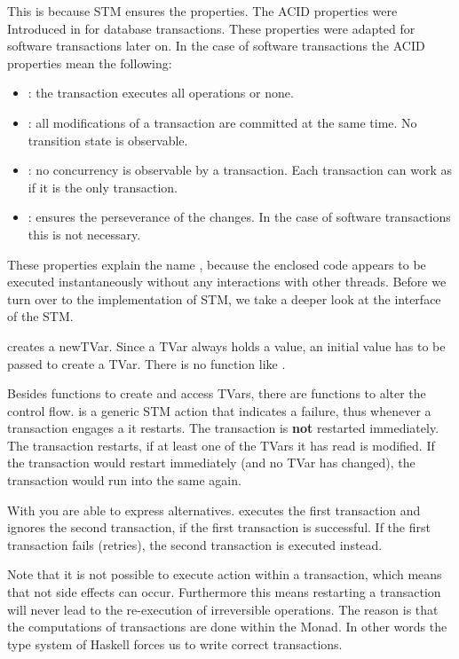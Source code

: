 This is because STM ensures the  properties. The ACID properties were Introduced in \parencite{DBTrans} for
database transactions. These properties were adapted for software transactions later on.
In the case of software transactions the ACID properties mean the following:
\begin{itemize}
 \item {}: the transaction executes all operations or none.
 \item {}: all modifications of a transaction are committed at the same time. No transition state is observable.
 \item {}: no concurrency is observable by a transaction. Each transaction can work as if it is the only transaction.
 \item {}: ensures the perseverance of the changes. In the case of software transactions this is not necessary.
\end{itemize}
These properties explain the name , because the enclosed code appears to be executed instantaneously without any 
interactions with other threads.
Before we turn over to the implementation of STM, we take a deeper look at the interface of the STM.

 creates a newTVar. Since a TVar always holds a value, an initial value has to be
passed to create a TVar. There is no function like . 

Besides functions to create and access TVars, there are functions to alter the control flow.
 is a generic STM action that indicates a failure, thus whenever a transaction engages a  it restarts. The transaction
is \textbf{not} restarted immediately. The transaction restarts, if at least one of the TVars it has read is modified. If the transaction would
restart immediately (and no TVar has changed), the transaction would run into the same  again. 

With  you are able to express alternatives.  executes the first transaction
and ignores the second transaction, if the first transaction is successful. If the first transaction fails (retries), the second transaction is 
executed instead.

Note that it is not possible to execute  action within a transaction, which means that not side effects can occur. Furthermore this means
restarting a transaction will never lead to the re-execution of irreversible operations. The reason is that the computations of transactions
are done within the  Monad. In other words the type system of Haskell forces us to write correct transactions. 

